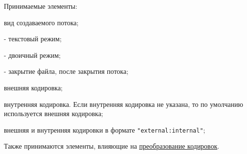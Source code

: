 \begin{keylist}{Принимаемые элементы:}
  
   вид создаваемого потока; 
  
   - текстовый режим; 
  
   - двоичный режим; 
  
   - закрытие файла, после закрытия потока; 
  
   внешняя кодировка; 
  
   внутренняя кодировка. Если внутренняя кодировка не указана, то по умолчанию используется внешняя кодировка; 
  
   внешняя и внутренняя кодировки в формате \verb!"external:internal"!;
\end{keylist}
   
Также принимаются элементы, влияющие на \hyperlink{appencode}{\underline{преобразование кодировок}}.